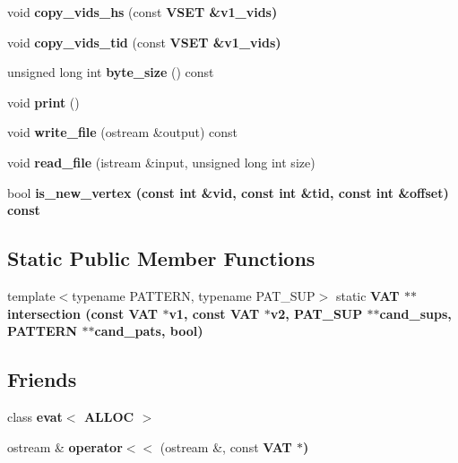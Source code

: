 \begin{CompactItemize}
\item 
void \textbf{copy\_\-vids\_\-hs} (const \bf{VSET} \&v1\_\-vids)\label{classvat_3_01GRAPH__PROP_00_01V__Fk1__MINE__PROP_00_01ALLOC_00_01ST_01_4_4c4e502c026f2c2127a3ce75bd3f19ad}

\item 
void \textbf{copy\_\-vids\_\-tid} (const \bf{VSET} \&v1\_\-vids)\label{classvat_3_01GRAPH__PROP_00_01V__Fk1__MINE__PROP_00_01ALLOC_00_01ST_01_4_5afc853d9101b42ff752a8cbc313fd59}

\item 
unsigned long int \textbf{byte\_\-size} () const \label{classvat_3_01GRAPH__PROP_00_01V__Fk1__MINE__PROP_00_01ALLOC_00_01ST_01_4_a1cbaa1b2c6a2943fd1d9fd1d020b570}

\item 
void \textbf{print} ()\label{classvat_3_01GRAPH__PROP_00_01V__Fk1__MINE__PROP_00_01ALLOC_00_01ST_01_4_8acb1de21b8f8e454b767c20a5cebd50}

\item 
void \textbf{write\_\-file} (ostream \&output) const \label{classvat_3_01GRAPH__PROP_00_01V__Fk1__MINE__PROP_00_01ALLOC_00_01ST_01_4_68a538ecf863c71727c35057b7562271}

\item 
void \textbf{read\_\-file} (istream \&input, unsigned long int size)\label{classvat_3_01GRAPH__PROP_00_01V__Fk1__MINE__PROP_00_01ALLOC_00_01ST_01_4_e980c72e8f18c657be8ab5068db4281d}

\item 
bool \bf{is\_\-new\_\-vertex} (const int \&vid, const int \&tid, const int \&offset) const 
\end{CompactItemize}
\subsection*{Static Public Member Functions}
\begin{CompactItemize}
\item 
template$<$typename PATTERN, typename PAT\_\-SUP$>$ static \bf{VAT} $\ast$$\ast$ \bf{intersection} (const \bf{VAT} $\ast$v1, const \bf{VAT} $\ast$v2, PAT\_\-SUP $\ast$$\ast$cand\_\-sups, PATTERN $\ast$$\ast$cand\_\-pats, bool)
\end{CompactItemize}
\subsection*{Friends}
\begin{CompactItemize}
\item 
class \bf{evat$<$ ALLOC $>$}\label{classvat_3_01GRAPH__PROP_00_01V__Fk1__MINE__PROP_00_01ALLOC_00_01ST_01_4_cc22506aa0348d52d0fc3cde32cfb7ca}

\item 
ostream \& \textbf{operator$<$$<$} (ostream \&, const \bf{VAT} $\ast$)\label{classvat_3_01GRAPH__PROP_00_01V__Fk1__MINE__PROP_00_01ALLOC_00_01ST_01_4_f1de00c5ba463d2cf1d08d1b212c46e0}

\end{CompactItemize}



